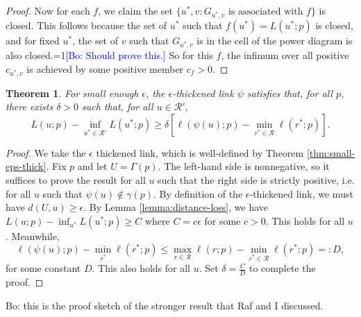 \documentclass{article}
\newcommand{\Comments}{1}
\newcommand{\mynote}[2]{\ifnum\Comments=1\textcolor{#1}{#2}\fi}
\newcommand{\bo}[1]{\mynote{blue}{[Bo: #1]}}
\newcommand{\R}{\mathcal{R}}
\newtheorem{theorem}{Theorem}
\theoremstyle{definition}
\begin{document}
\begin{proof}
  Now for each $f$, we claim the set $\{u^*, v : \text{$G_{u^*,v}$ is associated with $f$}\}$ is closed.
  This follows because the set of $u^*$ such that $f(u^*) = \underbar{L}(u^*;p)$ is closed, and for fixed $u^*$, the set of $v$ such that $G_{u^*,v}$ is in the cell of the power diagram is also closed.\bo{Should prove this.}
  So for this $f$, the infimum over all positive $c_{u^*,v}$ is achieved by some positive member $c_f > 0$.
\end{proof}

\begin{theorem}
  For small enough $\epsilon$, the $\epsilon$-thickened link $\psi$ satisfies that, for all $p$, there exists $\delta > 0$ such that, for all $u \in \R'$,
    \[ L(u;p) - \inf_{u^* \in \R'} L(u^*;p) \geq \delta \left[ \ell(\psi(u);p) - \min_{r^* \in \R} \ell(r^*;p) \right] . \]
\end{theorem}
\begin{proof}
  We take the $\epsilon$ thickened link, which is well-defined by Theorem \ref{thm:small-eps-thick}.
  Fix $p$ and let $U = \Gamma(p)$.
  The left-hand side is nonnegative, so it suffices to prove the result for all $u$ such that the right side is strictly positive, i.e. for all $u$ such that $\psi(u) \not\in \gamma(p)$.
  By definition of the $\epsilon$-thickened link, we must have $d(U,u) \geq \epsilon$.
  By Lemma \ref{lemma:distance-loss}, we have $L(u;p) - \inf_{u^*} L(u^*;p) \geq C$ where $C = c\epsilon$ for some $c > 0$.
  This holds for all $u$.
  Meanwhile,
    \[ \ell(\psi(u);p) - \min_{r^*} \ell(r^*;p) \leq \max_{r \in \R} \ell(r;p) - \min_{r^* \in \R} \ell(r^*;p) =: D, \]
  for some constant $D$.
  This also holds for all $u$.
  Set $\delta = \frac{C}{D}$ to complete the proof.
\end{proof}






\break

Bo: this is the proof sketch of the stronger result that Raf and I discussed.
\end{document}
